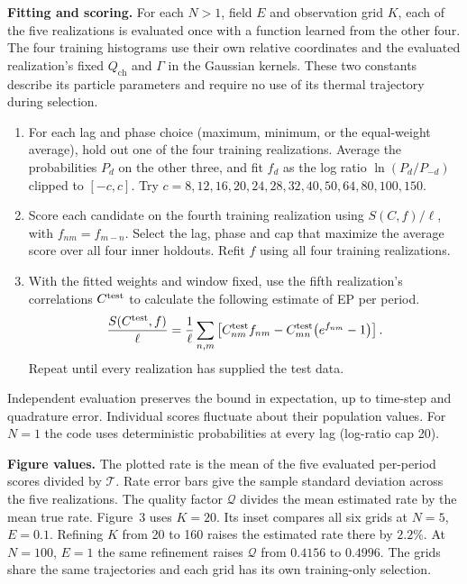 \documentclass[11pt,letterpaper]{article}
\newcommand{\Tr}{\mathcal T}
\newcommand{\ch}{Q_{\mathrm{ch}}}
\begin{document}
\textbf{Fitting and scoring.}
For each $N>1$, field $E$ and observation grid $K$, each of the five realizations is evaluated once
with a function learned from the other four. The four training histograms use their own
relative coordinates and the evaluated realization's fixed $\ch$ and $\Gamma$ in the Gaussian
kernels. These two constants describe its particle parameters and require no use of its
thermal trajectory during selection.
\begin{enumerate}
\item For each lag and phase choice (maximum, minimum, or the equal-weight average), hold out
one of the four training realizations. Average the probabilities $P_d$ on the other three,
and fit $f_d$ as the log ratio $\ln(P_d/P_{-d})$ clipped to $[-c,c]$.
Try $c=8,12,16,20,24,28,32,40,50,64,80,100,150$.
\item Score each candidate on the fourth training realization using $S(C,f)/\ell$,
with $f_{nm}=f_{m-n}$. Select the lag, phase and cap that maximize the average score
over all four inner holdouts. Refit $f$ using all four training realizations.
\item With the fitted weights and window fixed, use the fifth realization's correlations
$C^{\rm test}$ to calculate the following estimate of EP per period.
\begin{equation}
 \frac{S(C^{\rm test},f)}{\ell}=\frac{1}{\ell}\sum_{n,m}
 \left[C^{\rm test}_{nm} f_{nm}-C^{\rm test}_{mn}\big(e^{f_{nm}}-1\big)\right].
 \label{eq:test-score}
\end{equation}
Repeat until every realization has supplied the test data.
\end{enumerate}
Independent evaluation preserves the bound in expectation, up to time-step and quadrature
error. Individual scores fluctuate about their population values. For $N=1$ the code
uses deterministic probabilities at every lag (log-ratio cap 20).

\textbf{Figure values.}
The plotted rate is the mean of the five evaluated per-period scores divided by $\Tr$.
Rate error bars give the sample standard deviation across the five realizations. The quality
factor $\mathcal Q$ divides the mean estimated rate by the mean true rate. Figure~3 uses $K=20$. Its inset compares all six grids at $N=5$, $E=0.1$. Refining $K$ from 20 to 160 raises the
estimated rate there by $2.2\%$. At $N=100$, $E=1$ the same refinement raises $\mathcal Q$
from $0.4156$ to $0.4996$. The grids share the same trajectories and each grid has its own
training-only selection.
\end{document}
